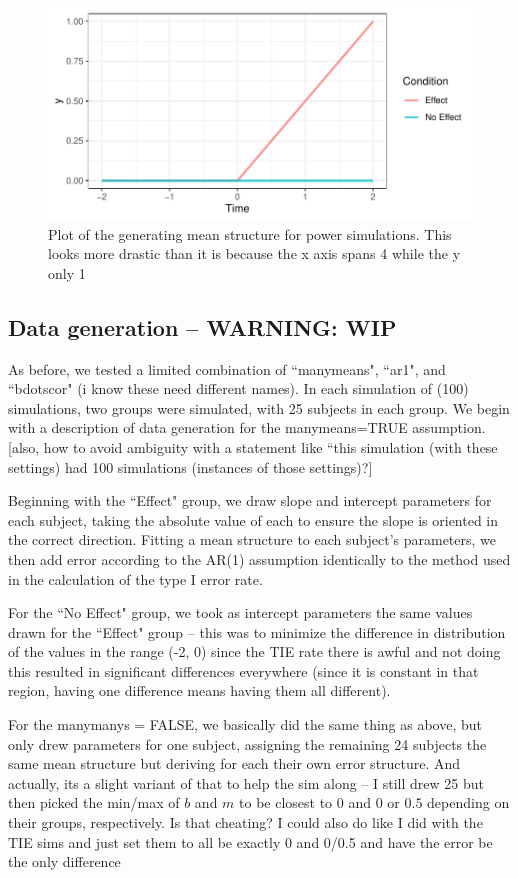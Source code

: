 \documentclass{article}
\begin{document}
\begin{figure}[H]
\centering
\includegraphics{power_plot.pdf}
\caption{Plot of the generating mean structure for power simulations. This looks more drastic than it is because the x axis spans 4 while the y only 1}
\label{fig:power_plot}
\end{figure}

\subsection{Data generation -- WARNING: WIP} As before, we tested a limited combination of ``manymeans", ``ar1", and ``bdotscor" (i know these need different names). In each simulation of (100) simulations, two groups were simulated, with 25 subjects in each group. We begin with a description of data generation for the manymeans=TRUE assumption. [also, how to avoid ambiguity with a statement like ``this simulation (with these settings) had 100 simulations (instances of those settings)?]

Beginning with the ``Effect" group, we draw slope and intercept parameters for each subject, taking the absolute value of each to ensure the slope is oriented in the correct direction. Fitting a mean structure to each subject's parameters, we then add error according to the AR(1) assumption identically to the method used in the calculation of the type I error rate.

For the ``No Effect" group, we took as intercept parameters the same values drawn for the ``Effect" group -- this was to minimize the difference in distribution of the values in the range (-2, 0) since the TIE rate there is awful and not doing this resulted in significant differences everywhere (since it is constant in that region, having one difference means having them all different). 

For the manymanys = FALSE, we basically did the same thing as above, but only drew parameters for one subject, assigning the remaining 24 subjects the same mean structure but deriving for each their own error structure. And actually, its a slight variant of that to help the sim along -- I still drew 25 but then picked the min/max of $b$ and $m$ to be closest to $0$ and $0$ or $0.5$ depending on their groups, respectively. Is that cheating? I could also do like I did with the TIE sims and just set them to all be exactly 0 and 0/0.5 and have the error be the only difference
\end{document}

